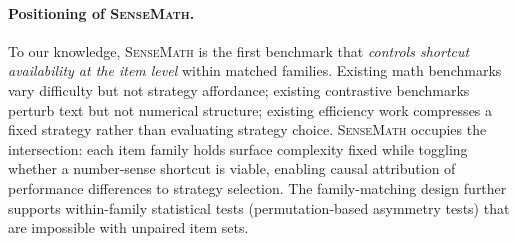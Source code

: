 \paragraph{Positioning of \textsc{SenseMath}.}
To our knowledge, \textsc{SenseMath} is the first benchmark that \emph{controls shortcut availability at the item level} within matched families.
Existing math benchmarks vary difficulty but not strategy affordance; existing contrastive benchmarks perturb text but not numerical structure; existing efficiency work compresses a fixed strategy rather than evaluating strategy choice.
\textsc{SenseMath} occupies the intersection: each item family holds surface complexity fixed while toggling whether a number-sense shortcut is viable, enabling causal attribution of performance differences to strategy selection.
The family-matching design further supports within-family statistical tests (permutation-based asymmetry tests) that are impossible with unpaired item sets.
